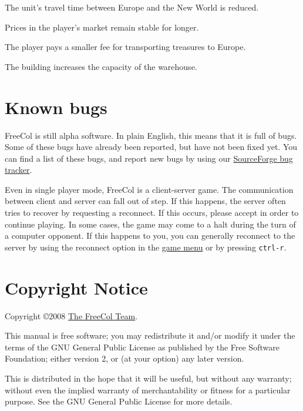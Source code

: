 \documentclass[12pt]{book}
\begin{document}
The unit's travel time between Europe and the New World is reduced.

\affectsPlayer

Prices in the player's market remain stable for longer.

\affectsPlayer

The player pays a smaller fee for transporting treasures to Europe.

\affectsBuilding

The building increases the capacity of the warehouse.




\hypertarget{Known bugs}{\chapter{Known bugs}}

FreeCol is still alpha software. In plain English, this means that it
is full of bugs. Some of these bugs have already been reported, but
have not been fixed yet. You can find a list of these bugs, and report
new bugs by using our
\href{http://sourceforge.net/tracker/?group_id=43225&atid=435578}{SourceForge
bug tracker}.

Even in single player mode, FreeCol is a client-server game. The
communication between client and server can fall out of step. If this
happens, the server often tries to recover by requesting a
reconnect. If this occurs, please accept in order to continue
playing. In some cases, the game may come to a halt during the turn of
a computer opponent. If this happens to you, you can generally
reconnect to the server by using the reconnect option in the
\hyperlink{game menu}{game menu} or by pressing \verb$ctrl-r$.


\hypertarget{Copyright Notice}{\chapter{Copyright Notice}}

Copyright \copyright 2008
\href{http://freecol.sourceforge.net/index.php?section=8}{The FreeCol
Team}.

This manual is free software; you may redistribute it and/or modify it
under the terms of the GNU General Public License as published by the
Free Software Foundation; either version 2, or (at your option) any
later version.

This is distributed in the hope that it will be useful, but without
any warranty; without even the implied warranty of merchantability or
fitness for a particular purpose. See the GNU General Public License
for more details.
\end{document}
